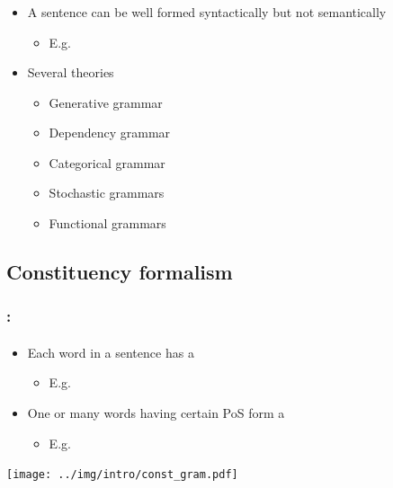 \documentclass[xcolor=table]{beamer}
\begin{document}
\begin{frame}
	\frametitle{\insertshortsubtitle}
	\framesubtitle{\insertsection}

	\begin{itemize}
		\item A sentence can be well formed syntactically but not semantically
		\begin{itemize}
			\item E.g. 
		\end{itemize}
		\item Several theories
		\begin{itemize}
			\item Generative grammar
			\item Dependency grammar
			\item Categorical grammar
			\item Stochastic grammars
			\item Functional grammars
		\end{itemize}
		
	\end{itemize}

\end{frame}

\subsection{Constituency formalism}

\begin{frame}
	\frametitle{\insertshortsubtitle: \insertsection}
	\framesubtitle{\insertsubsection}

	\begin{itemize}
		\item Each word in a sentence has a 
		\begin{itemize}
			\item E.g. 
		\end{itemize}
		\item One or many words having certain PoS form a 
		\begin{itemize}
			\item E.g. 
		\end{itemize}
	\end{itemize}
	
	\begin{center}
		\texttt{[image: ../img/intro/const\_gram.pdf]}
	\end{center}

\end{frame}
\end{document}
